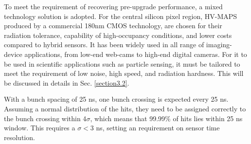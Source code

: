 To meet the requirement of recovering pre-upgrade performance, a mixed technology solution is adopted. For the central silicon pixel region, HV-MAPS produced by a commercial 180nm CMOS technology, are chosen for their radiation tolerance, capability of high-occupancy conditions, and lower costs compared to hybrid sensors. It has been widely used in all range of imaging-device applications, from low-end web-cams to high-end digital cameras\cite{HVMAPS}. For it to be used in scientific applications such as particle sensing, it must be tailored to meet the requirement of low noise, high speed, and radiation hardness. This will be discussed in details in Sec. \ref{section3.2}.


With a bunch spacing of 25 ns\cite{HLLHC}, one bunch crossing is expected every 25 ns. Assuming a normal distribution of the hits, they need to be assigned correctly to the bunch crossing within 4$\sigma$, which means that 99.99\% of hits lies within 25 ns window. This requires a $\sigma<$3 ns, setting an requirement on sensor time resolution.
